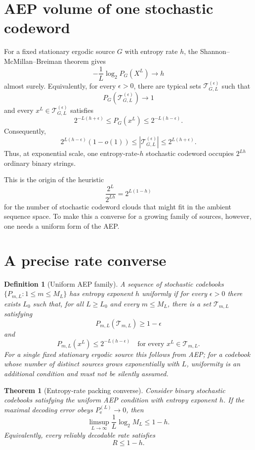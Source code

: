 \documentclass[11pt]{article}
\newtheorem{theorem}{Theorem}
\newtheorem{definition}{Definition}
\newcommand{\T}{\mathcal{T}}
\newcommand{\Pe}{P_{\mathrm e}}
\begin{document}
\section{AEP volume of one stochastic codeword}
For a fixed stationary ergodic source $G$ with entropy rate $h$, the Shannon--McMillan--Breiman theorem gives
\[
-\frac1L\log_2 P_G(X^L)\longrightarrow h
\]
almost surely.  Equivalently, for every $\epsilon>0$, there are typical sets $\T_{G,L}^{(\epsilon)}$ such that
\[
P_G(\T_{G,L}^{(\epsilon)})\to1
\]
and every $x^L\in\T_{G,L}^{(\epsilon)}$ satisfies
\[
2^{-L(h+\epsilon)}\le P_G(x^L)\le 2^{-L(h-\epsilon)}.
\]
Consequently,
\[
2^{L(h-\epsilon)}(1-o(1))
\le |\T_{G,L}^{(\epsilon)}|
\le 2^{L(h+\epsilon)}.
\]
Thus, at exponential scale, one entropy-rate-$h$ stochastic codeword occupies $2^{Lh}$ ordinary binary strings.

This is the origin of the heuristic
\[
\frac{2^L}{2^{Lh}}=2^{L(1-h)}
\]
for the number of stochastic codeword clouds that might fit in the ambient sequence space.  To make this a converse for a growing family of sources, however, one needs a uniform form of the AEP.

\section{A precise rate converse}
\begin{definition}[Uniform AEP family]
A sequence of stochastic codebooks $\{P_{m,L}:1\le m\le M_L\}$ has entropy exponent $h$ uniformly if for every $\epsilon>0$ there exists $L_0$ such that, for all $L\ge L_0$ and every $m\le M_L$, there is a set $\T_{m,L}$ satisfying
\[
P_{m,L}(\T_{m,L})\ge1-\epsilon
\]
and
\[
P_{m,L}(x^L)\le 2^{-L(h-\epsilon)}
\quad\text{for every }x^L\in\T_{m,L}.
\]
For a single fixed stationary ergodic source this follows from AEP; for a codebook whose number of distinct sources grows exponentially with $L$, uniformity is an additional condition and must not be silently assumed.
\end{definition}

\begin{theorem}[Entropy-rate packing converse]
Consider binary stochastic codebooks satisfying the uniform AEP condition with entropy exponent $h$.  If the maximal decoding error obeys $\Pe^{(L)}\to0$, then
\[
\limsup_{L\to\infty}\frac1L\log_2 M_L\le 1-h.
\]
Equivalently, every reliably decodable rate satisfies
\[
\boxed{R\le1-h.}
\]
\end{theorem}
\end{document}
